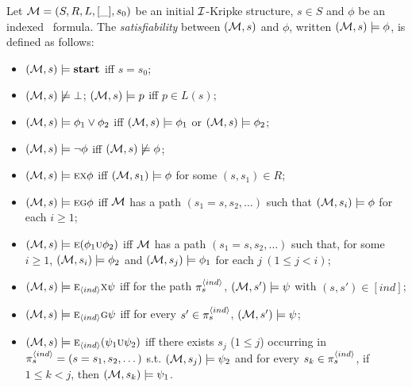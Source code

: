 \documentclass[twoside,11pt]{article}
\begin{document}
\begin{definition}
    Let ${\cal M}=(S,R,L,[\_],s_0)$ be an initial ${\cal I}$-Kripke structure, $s\in S$ and $\phi$ be an indexed \CTL\ formula.
The {\em satisfiability}  between $({\cal M},s)$ and $\phi$,
written $({\cal M},s)\models\phi$, is defined as follows:
\begin{itemize}
    \item $({\cal M},s) \models \textbf{start}$ iff $s=s_0$;
	\item $({\cal M},s)\not\models\bot$;
    $({\cal M},s)\models p$ iff $p\in L(s)$;
	\item $({\cal M},s)\models \phi_1\lor\phi_2$ iff
	$({\cal M},s)\models \phi_1$ or $({\cal M},s)\models \phi_2$;
	\item $({\cal M},s)\models \neg\phi$ iff  $({\cal M},s)\not\models\phi$;
	\item $({\cal M},s)\models \textsc{e}\textsc{x}\phi$ iff
	$({\cal M},s_1)\models\phi$ for some $(s,s_1)\in R$;
	\item $({\cal M},s)\models \textsc{e}\textsc{g}\phi$ iff
	$\cal M$ has a path $(s_1=s,s_2,\ldots)$ such that
	$({\cal M},s_i)\models\phi$ for each $i\ge 1$;
	\item $({\cal M},s)\models \textsc{e}(\phi_1\textsc{u}\phi_2)$ iff
	$\cal M$ has a path $(s_1=s,s_2,\ldots)$ such that, for some $i\ge 1$,
	$({\cal M},s_i)\models\phi_2$ and
	$({\cal M},s_j)\models\phi_1$ for each $j~(1\leq j<i)$;
	\item $({\cal M},s)\models \textsc{e}_{{\langle{ind}\rangle}} \textsc{x} \psi$ iff for the path $\pi_{s}^{{\langle{ind}\rangle}}$, $({\cal M}, s')\models \psi$ with $(s, s') \in [ind]$;
	\item $({\cal M},s)\models \textsc{e}_{{\langle{ind}\rangle}}\textsc{g}\psi$ iff
	for every $s' \in  \pi_{s}^{{\langle{ind}\rangle}}$, %
	$({\cal M},s') \models \psi$;
	\item $({\cal M},s)\models \textsc{e}_{{\langle{ind}\rangle}}(\psi_1\textsc{u}\psi_2)$ iff
	there exists $s_j$ ($1\leq j$) occurring in $ \pi_{s}^{{\langle{ind}\rangle}} = (s=s_1, s_2, \dots)$ s.t. $({\cal M},s_j) \models \psi_2$ and for every $s_k \in \pi_{s}^{{\langle{ind}\rangle}}$, if $1\leq k < j$, then $({\cal M},s_k) \models \psi_1$.
\end{itemize}
\end{definition}
\end{document}
